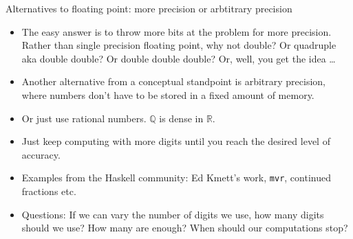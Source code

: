 \documentclass{beamer}
\begin{document}
\begin{frame}{Alternatives to floating point: more precision or arbtitrary precision}
\begin{itemize}
\item The easy answer is to throw more bits at the problem for more precision. Rather than single precision 				floating point, why not double? Or quadruple aka double double? Or double double double? Or, well, you 				get the idea \ldots
\item Another alternative from a conceptual standpoint is arbitrary precision, where numbers don't have to be
			stored in a fixed amount of memory.
\item Or just use rational numbers. $\mathbb{Q}$ is dense in $\mathbb{R}$.
\item Just keep computing with more digits until you reach the desired level of accuracy.
\item Examples from the Haskell community: Ed Kmett's work, \texttt{mvr}, continued fractions etc.
\item Questions: If we can vary the number of digits we use, how many digits should we use? How many are 
			enough? When should our computations stop?
\end{itemize}
\end{frame}
\end{document}
